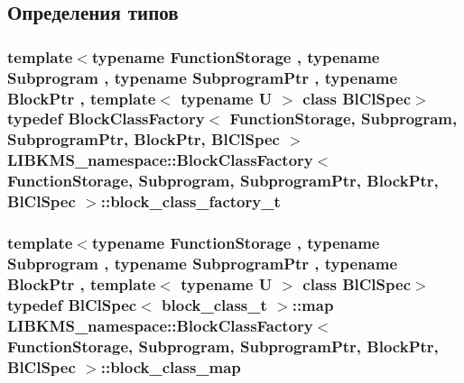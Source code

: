 \subsection{Определения типов}
\hypertarget{classLIBKMS__namespace_1_1BlockClassFactory_ac764a55036aeecf1279f5b43464ab9ad}{
\subsubsection[{block\-\_\-class\-\_\-factory\-\_\-t}]{\setlength{\rightskip}{0pt plus 5cm}template$<$typename Function\-Storage , typename Subprogram , typename Subprogram\-Ptr , typename Block\-Ptr , template$<$ typename U $>$ class Bl\-Cl\-Spec$>$ typedef {\bf Block\-Class\-Factory}$<$ {\bf Function\-Storage}, {\bf Subprogram}, Subprogram\-Ptr, Block\-Ptr, Bl\-Cl\-Spec $>$ {\bf L\-I\-B\-K\-M\-S\-\_\-namespace\-::\-Block\-Class\-Factory}$<$ {\bf Function\-Storage}, {\bf Subprogram}, Subprogram\-Ptr, Block\-Ptr, Bl\-Cl\-Spec $>$\-::{\bf block\-\_\-class\-\_\-factory\-\_\-t}}}\label{classLIBKMS__namespace_1_1BlockClassFactory_ac764a55036aeecf1279f5b43464ab9ad}
\hypertarget{classLIBKMS__namespace_1_1BlockClassFactory_a6c80887a7827dcc55a3508b242b906c9}{
\subsubsection[{block\-\_\-class\-\_\-map}]{\setlength{\rightskip}{0pt plus 5cm}template$<$typename Function\-Storage , typename Subprogram , typename Subprogram\-Ptr , typename Block\-Ptr , template$<$ typename U $>$ class Bl\-Cl\-Spec$>$ typedef Bl\-Cl\-Spec$<$ {\bf block\-\_\-class\-\_\-t} $>$\-::map {\bf L\-I\-B\-K\-M\-S\-\_\-namespace\-::\-Block\-Class\-Factory}$<$ {\bf Function\-Storage}, {\bf Subprogram}, Subprogram\-Ptr, Block\-Ptr, Bl\-Cl\-Spec $>$\-::{\bf block\-\_\-class\-\_\-map}}}\label{classLIBKMS__namespace_1_1BlockClassFactory_a6c80887a7827dcc55a3508b242b906c9}
